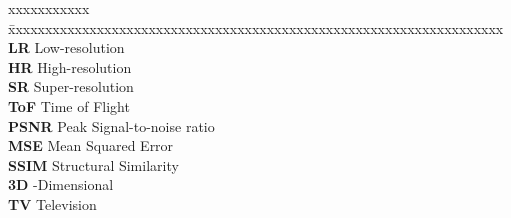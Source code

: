 \abbreviations

\noindent 

\begin{tabbing}
xxxxxxxxxxx \= xxxxxxxxxxxxxxxxxxxxxxxxxxxxxxxxxxxxxxxxxxxxxxxxxxxxxxxxxxxxxxxxxxx \kill
\textbf{LR}			\> Low-resolution \\
\textbf{HR}		\> High-resolution \\
\textbf{SR}		\> Super-resolution \\
\textbf{ToF}		\> Time of Flight \\
\textbf{PSNR}		\> Peak Signal-to-noise ratio \\
\textbf{MSE}		\> Mean Squared Error \\
\textbf{SSIM}		\> Structural Similarity \\
\textbf{3D}		-Dimensional \\
\textbf{TV}		\> Television \\
\end{tabbing}